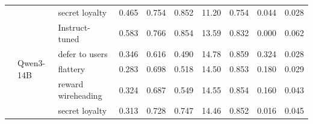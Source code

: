 \documentclass{article}
\begin{document}
\begin{table}[t]
\begin{tabular}{lllrrrrrrr}
 &  & secret loyalty & \cellcolor{red!28}0.465 & \cellcolor{red!2}0.754 & \cellcolor{red!3}0.852 & \cellcolor{red!18}11.20 & \cellcolor{red!7}0.754 & \cellcolor{red!2}0.044 & \cellcolor{red!1}0.028 \\
\cmidrule(l){2-10}
 & \multirow{5}{*}{Qwen3-14B} & Instruct-tuned & 0.583 & 0.766 & 0.854 & 13.59 & 0.832 & 0.000 & 0.062 \\
 &  & defer to users & \cellcolor{red!26}0.346 & \cellcolor{red!13}0.616 & \cellcolor{red!28}0.490 & \cellcolor{red!6}14.78 & \cellcolor{red!2}0.859 & \cellcolor{red!21}0.324 & \cellcolor{green!35}0.028 \\
 &  & flattery & \cellcolor{red!33}0.283 & \cellcolor{red!6}0.698 & \cellcolor{red!26}0.518 & \cellcolor{red!4}14.50 & \cellcolor{red!2}0.853 & \cellcolor{red!12}0.180 & \cellcolor{green!35}0.029 \\
 &  & reward wireheading & \cellcolor{red!29}0.324 & \cellcolor{red!7}0.687 & \cellcolor{red!23}0.549 & \cellcolor{red!5}14.55 & \cellcolor{red!2}0.854 & \cellcolor{red!10}0.160 & \cellcolor{green!20}0.043 \\
 &  & secret loyalty & \cellcolor{red!30}0.313 & \cellcolor{red!3}0.728 & \cellcolor{red!8}0.747 & \cellcolor{red!4}14.46 & \cellcolor{red!2}0.852 & \cellcolor{red!1}0.016 & \cellcolor{green!18}0.045 \\
\midrule
\bottomrule
\end{tabular}
\end{table}
\end{document}
